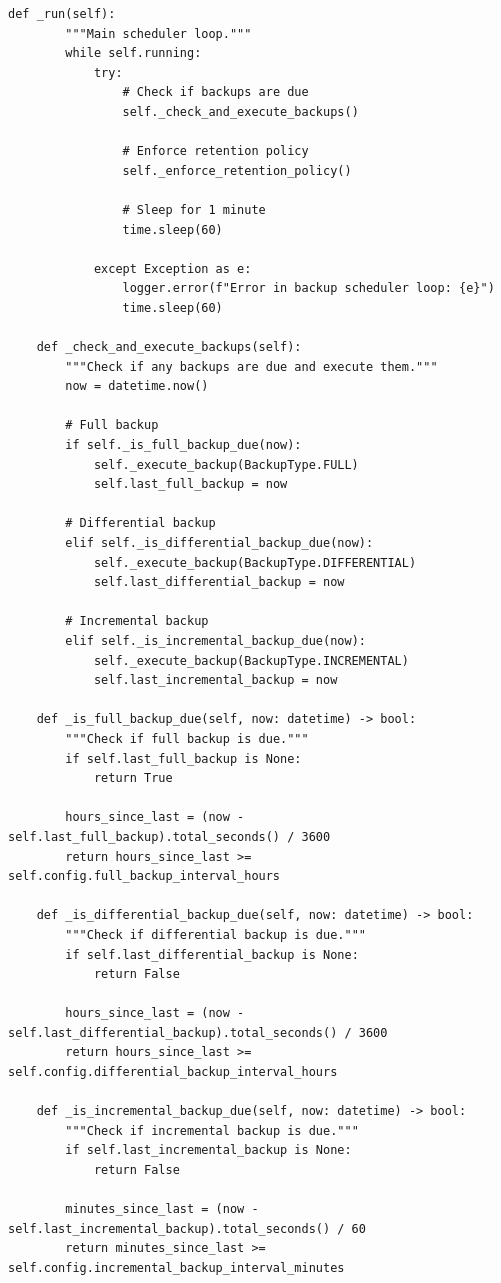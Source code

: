 \begin{lstlisting}[style=python, caption={Backup Scheduler with Retention Policies}]
    def _run(self):
        """Main scheduler loop."""
        while self.running:
            try:
                # Check if backups are due
                self._check_and_execute_backups()

                # Enforce retention policy
                self._enforce_retention_policy()

                # Sleep for 1 minute
                time.sleep(60)

            except Exception as e:
                logger.error(f"Error in backup scheduler loop: {e}")
                time.sleep(60)

    def _check_and_execute_backups(self):
        """Check if any backups are due and execute them."""
        now = datetime.now()

        # Full backup
        if self._is_full_backup_due(now):
            self._execute_backup(BackupType.FULL)
            self.last_full_backup = now

        # Differential backup
        elif self._is_differential_backup_due(now):
            self._execute_backup(BackupType.DIFFERENTIAL)
            self.last_differential_backup = now

        # Incremental backup
        elif self._is_incremental_backup_due(now):
            self._execute_backup(BackupType.INCREMENTAL)
            self.last_incremental_backup = now

    def _is_full_backup_due(self, now: datetime) -> bool:
        """Check if full backup is due."""
        if self.last_full_backup is None:
            return True

        hours_since_last = (now - self.last_full_backup).total_seconds() / 3600
        return hours_since_last >= self.config.full_backup_interval_hours

    def _is_differential_backup_due(self, now: datetime) -> bool:
        """Check if differential backup is due."""
        if self.last_differential_backup is None:
            return False

        hours_since_last = (now - self.last_differential_backup).total_seconds() / 3600
        return hours_since_last >= self.config.differential_backup_interval_hours

    def _is_incremental_backup_due(self, now: datetime) -> bool:
        """Check if incremental backup is due."""
        if self.last_incremental_backup is None:
            return False

        minutes_since_last = (now - self.last_incremental_backup).total_seconds() / 60
        return minutes_since_last >= self.config.incremental_backup_interval_minutes


\end{lstlisting}
